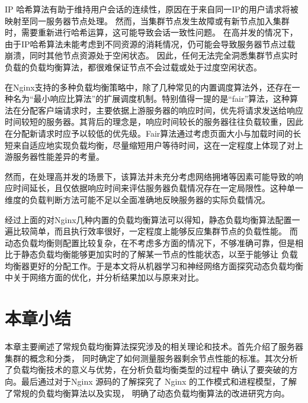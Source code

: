 IP 哈希算法有助于维持用户会话的连续性，原因在于来自同一IP的用户请求将被映射至同一服务器节点处理。
然而，当集群节点发生故障或有新节点加入集群时，需要重新进行哈希运算，这可能导致会话一致性问题。
在高并发的情况下，由于IP哈希算法未能考虑到不同资源的消耗情况，仍可能会导致服务器节点过载崩溃，同时其他节点资源处于空闲状态。
因此，任何无法完全洞悉集群节点实时负载的负载均衡算法，都很难保证节点不会过载或处于过度空闲状态。

在Nginx支持的多种负载均衡策略中，除了几种常见的内置调度算法外，还存在一种名为“最小响应比算法”的扩展调度机制。特别值得一提的是“fair”算法，这种算法在分配客户端请求时，主要依据上游服务器的响应时间，优先将请求发送给响应时间较短的服务器。其背后的理念是，响应时间较长的服务器往往负载较重，因此在分配新请求时应予以较低的优先级。Fair算法通过考虑页面大小与加载时间的长短来自适应地实现负载均衡，尽量缩短用户等待时间，这在一定程度上体现了对上游服务器性能差异的考量。

然而，在处理高并发的场景下，该算法并未充分考虑网络拥堵等因素可能导致的响应时间延长，且仅依据响应时间来评估服务器负载情况存在一定局限性。这种单一维度的负载判断方法可能不足以全面准确地反映服务器的实际负载情况\cite{张艳肖2023基于Fair函数神经网络的厚度传感器输出特性分析}。

经过上面的对Nginx几种内置的负载均衡算法可以得知，静态负载均衡算法配置一遍比较简单，而且执行效率很好，一定程度上能够反应集群节点的负载性能。
而动态负载均衡则配置比较复杂，在不考虑多方面的情况下，不够准确可靠，但是相比于静态负载均衡能够更加实时的了解某一节点的性能状态，以至于能够让
负载均衡器更好的分配工作。于是本文将从机器学习和神经网络方面探究动态负载均衡中关于网络方面的优化，并分析结果加以与原来对比。

\section{本章小结}

本章主要阐述了常规负载均衡算法探究涉及的相关理论和技术。首先介绍了服务器集群的概念和分类，
同时确定了如何测量服务器剩余节点性能的标准。其次分析了负载均衡技术的意义与优势，在分析负载均衡类型的过程中
确认了要突破的方向。最后通过对于Nginx 源码的了解探究了 Nginx 的工作模式和进程模型，了解了常规的负载均衡算法以及实现，
明确了动态负载均衡算法的改进研究方向。
